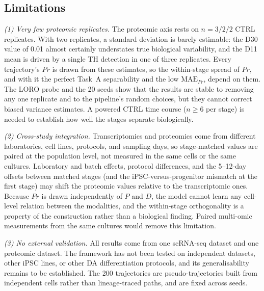 \documentclass[5p,times,twocolumn]{elsarticle}
\newcommand{\rtag}[1]{}
\newenvironment{revblock}[1]{\par\color{red}\rtag{#1}\ignorespaces}{\par}
\begin{document}
\subsection{\textbf{Limitations}}
\label{sec:limitations}

\begin{revblock}{R1.5,R2.8,R2.18}
  \textit{(1) Very few proteomic replicates.} The proteomic axis
  rests on $n = 3/2/2$ CTRL replicates. With two replicates, a
  standard deviation is barely estimable: the D30 value of 0.01
  almost certainly understates true biological variability, and
  the D11 mean is driven by a single TH detection in one of three
  replicates. Every trajectory's $Pr$ is drawn from these
  estimates, so the within-stage spread of $Pr$, and with it the
  perfect Task~A separability and the low $\text{MAE}_{Pr}$, depend
  on them. The LORO probe and the 20 seeds show that the results
  are stable to removing any one replicate and to the pipeline's
  random choices, but they cannot correct biased variance
  estimates. A powered CTRL time course ($n \geq 6$ per stage) is
  needed to establish how well the stages separate biologically.
\end{revblock}

\begin{revblock}{R2.17}
  \textit{(2) Cross-study integration.} Transcriptomics and
  proteomics come from different laboratories, cell lines,
  protocols, and sampling days, so stage-matched values are
  paired at the population level, not measured in the same cells
  or the same cultures. Laboratory and batch effects, protocol
  differences, and the 5--12-day offsets between matched stages
  (and the iPSC-versus-progenitor mismatch at the first stage)
  may shift the proteomic values relative to the transcriptomic
  ones. Because $Pr$ is drawn independently of $P$ and $D$, the
  model cannot learn any cell-level relation between the
  modalities, and the within-stage orthogonality is a property of
  the construction rather than a biological finding. Paired
  multi-omic measurements from the same cultures would remove
  this limitation.
\end{revblock}

\begin{revblock}{R2.19}
  \textit{(3) No external validation.} All results come from one
  scRNA-seq dataset and one proteomic dataset. The framework has
  not been tested on independent datasets, other iPSC lines, or
  other DA differentiation protocols, and its generalisability
  remains to be established. The 200 trajectories are
  pseudo-trajectories built from independent cells rather than
  lineage-traced paths, and are fixed across seeds.
\end{revblock}
\end{document}
